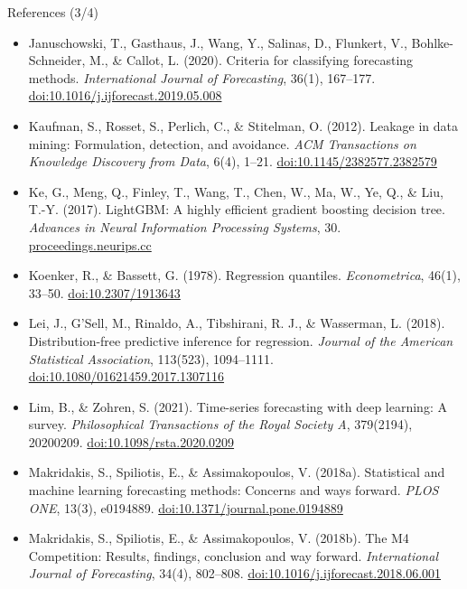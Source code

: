 \begin{frame}{References (3/4)}
\itemsize{\scriptsize}
\begin{itemize}
    \item Januschowski, T., Gasthaus, J., Wang, Y., Salinas, D., Flunkert, V., Bohlke-Schneider, M., \& Callot, L. (2020). Criteria for classifying forecasting methods. \textit{International Journal of Forecasting}, 36(1), 167--177. \href{https://doi.org/10.1016/j.ijforecast.2019.05.008}{doi:10.1016/j.ijforecast.2019.05.008}
    \item Kaufman, S., Rosset, S., Perlich, C., \& Stitelman, O. (2012). Leakage in data mining: Formulation, detection, and avoidance. \textit{ACM Transactions on Knowledge Discovery from Data}, 6(4), 1--21. \href{https://doi.org/10.1145/2382577.2382579}{doi:10.1145/2382577.2382579}
    \item Ke, G., Meng, Q., Finley, T., Wang, T., Chen, W., Ma, W., Ye, Q., \& Liu, T.-Y. (2017). LightGBM: A highly efficient gradient boosting decision tree. \textit{Advances in Neural Information Processing Systems}, 30. \href{https://proceedings.neurips.cc/paper/2017/hash/6449f44a102fde848669bdd9eb6b76fa-Abstract.html}{proceedings.neurips.cc}
    \item Koenker, R., \& Bassett, G. (1978). Regression quantiles. \textit{Econometrica}, 46(1), 33--50. \href{https://doi.org/10.2307/1913643}{doi:10.2307/1913643}
    \item Lei, J., G'Sell, M., Rinaldo, A., Tibshirani, R. J., \& Wasserman, L. (2018). Distribution-free predictive inference for regression. \textit{Journal of the American Statistical Association}, 113(523), 1094--1111. \href{https://doi.org/10.1080/01621459.2017.1307116}{doi:10.1080/01621459.2017.1307116}
    \item Lim, B., \& Zohren, S. (2021). Time-series forecasting with deep learning: A survey. \textit{Philosophical Transactions of the Royal Society A}, 379(2194), 20200209. \href{https://doi.org/10.1098/rsta.2020.0209}{doi:10.1098/rsta.2020.0209}
    \item Makridakis, S., Spiliotis, E., \& Assimakopoulos, V. (2018a). Statistical and machine learning forecasting methods: Concerns and ways forward. \textit{PLOS ONE}, 13(3), e0194889. \href{https://doi.org/10.1371/journal.pone.0194889}{doi:10.1371/journal.pone.0194889}
    \item Makridakis, S., Spiliotis, E., \& Assimakopoulos, V. (2018b). The M4 Competition: Results, findings, conclusion and way forward. \textit{International Journal of Forecasting}, 34(4), 802--808. \href{https://doi.org/10.1016/j.ijforecast.2018.06.001}{doi:10.1016/j.ijforecast.2018.06.001}
\end{itemize}
\end{frame}

